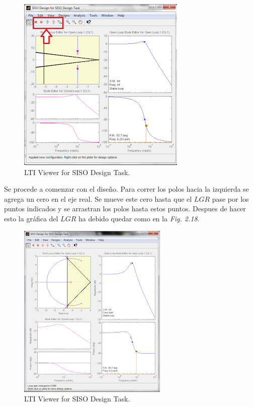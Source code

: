 \documentclass[a4paper,12pt,twoside]{proyectotanquesecci}
\begin{document}
\begin{figure}[h]
\centering
\includegraphics[scale=0.7]{Ventana11}
\renewcommand{\figurename}{Fig.}
\caption{LTI Viewer for SISO Design Task.}
\label{LTI Viewer for SISO Design Task.}
\end{figure}

Se procede a comenzar con el diseño. Para correr los polos hacia la izquierda se agrega un cero en el eje real. Se mueve este cero hasta que el $LGR$ pase por los puntos indicados y se arrastran los polos hasta estos puntos. Despues de hacer esto la gráfica del $LGR$ ha debido quedar como en la \textit{Fig. 2.18}. \\

\begin{figure}[h]
\centering
\includegraphics[scale=0.7]{Ventana12}
\renewcommand{\figurename}{Fig.}
\caption{LTI Viewer for SISO Design Task.}
\label{LTI Viewer for SISO Design Task.}
\end{figure}
\end{document}
